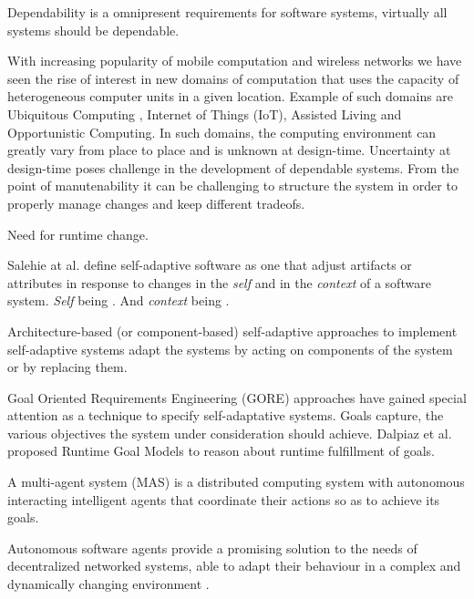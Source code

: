 Dependability is a omnipresent requirements for software systems, virtually all systems should be dependable.

With increasing popularity of mobile computation and wireless networks we have seen the rise of  interest in new domains of computation that uses the capacity of heterogeneous computer units in a given location.
Example of such domains are Ubiquitous Computing \cite{bell_yesterdays_2007}, Internet of Things (IoT)\cite{atzori_internet_2010}, Assisted Living\cite{kleinberger_ambient_2007} and Opportunistic Computing\cite{smaldone_improving_2011}. In such domains, the computing environment can greatly vary from place to place and is unknown at design-time.
Uncertainty at design-time poses challenge in the development of dependable systems. From the point of manutenability it can be challenging to structure the system in order to properly manage changes and keep different tradeofs.

Need for runtime change.

Salehie at al. \cite{salehie_self-adaptive_2009} define self-adaptive software as one that adjust artifacts or attributes in response to changes in the \textit{self} and in the \textit{context} of a software system.
\textit{Self} being . And \textit{context} being .

Architecture-based (or component-based) self-adaptive approaches to implement self-adaptive systems adapt the systems by acting on components of the system or by replacing them\cite{garlan_software_2009}.


Goal Oriented Requirements Engineering (GORE) approaches have gained special attention as a technique to specify self-adaptative systems\cite{morandini_goal-oriented_2009}.
Goals capture, the various objectives the system under consideration should achieve\cite{van_lamsweerde_goal-oriented_2001}.
Dalpiaz et al.\cite{dalpiaz_runtime_2013} proposed Runtime Goal Models to reason about runtime fulfillment of goals.

A multi-agent system (MAS) is a distributed computing system with autonomous interacting intelligent agents that coordinate their actions so as to achieve its goals\cite{woolridge_introduction_2001}.

Autonomous software agents provide a promising solution to the needs of decentralized networked systems, able to adapt their behaviour in a complex and dynamically changing environment \cite{morandini_goal-oriented_2009}.

